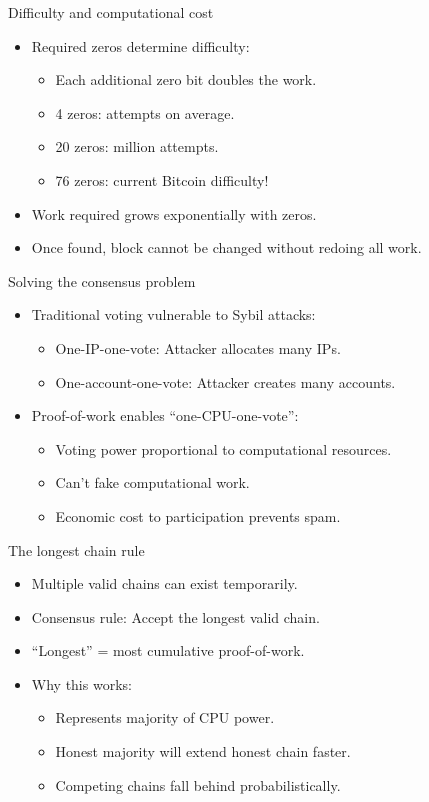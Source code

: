 \documentclass[aspectratio=169, lualatex, handout]{beamer}
\begin{document}
\begin{frame}{Difficulty and computational cost}
	\begin{itemize}
		\item Required zeros determine difficulty:
		      \begin{itemize}
			      \item Each additional zero bit doubles the work.
			      \item 4 zeros:  attempts on average.
			      \item 20 zeros:  million attempts.
			      \item 76 zeros: current Bitcoin difficulty!
		      \end{itemize}
		\item Work required grows exponentially with zeros.
		\item Once found, block cannot be changed without redoing all work.
	\end{itemize}
\end{frame}

\begin{frame}{Solving the consensus problem}
	\begin{itemize}
		\item Traditional voting vulnerable to Sybil attacks:
		      \begin{itemize}
			      \item One-IP-one-vote: Attacker allocates many IPs.
			      \item One-account-one-vote: Attacker creates many accounts.
		      \end{itemize}
		\item Proof-of-work enables ``one-CPU-one-vote'':
		      \begin{itemize}
			      \item Voting power proportional to computational resources.
			      \item Can't fake computational work.
			      \item Economic cost to participation prevents spam.
		      \end{itemize}
	\end{itemize}
\end{frame}

\begin{frame}{The longest chain rule}
	\begin{itemize}
		\item Multiple valid chains can exist temporarily.
		\item Consensus rule: Accept the longest valid chain.
		\item ``Longest'' = most cumulative proof-of-work.
		\item Why this works:
		      \begin{itemize}
			      \item Represents majority of CPU power.
			      \item Honest majority will extend honest chain faster.
			      \item Competing chains fall behind probabilistically.
		      \end{itemize}
	\end{itemize}
\end{frame}
\end{document}
